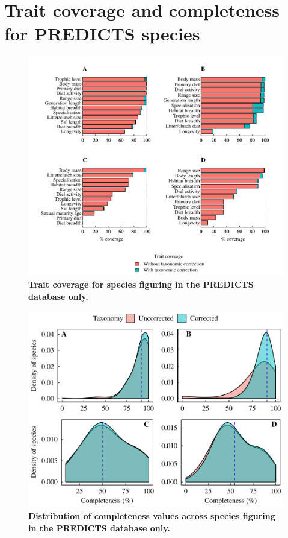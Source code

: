 \documentclass[11pt]{article}
\begin{document}
\section{Trait coverage and completeness for PREDICTS species}
\begin{figure}[h!]
\centering
\includegraphics[scale=0.65]{figures/Predicts}
\caption[Trait coverage for species figuring in the PREDICTS database only]{\textbf{Trait coverage for species figuring in the PREDICTS database only.}}
\label{covPREDICTS}
\end{figure}

\begin{figure}[h!]
\centering
\includegraphics[scale=0.65]{figures/Traitcompleteness_PREDICTS}
\caption[Distribution of completeness values across species figuring in the PREDICTS database only]{\textbf{Distribution of completeness values across species figuring in the PREDICTS database only.}}
\label{compPREDICTS}
\end{figure}
\end{document}
